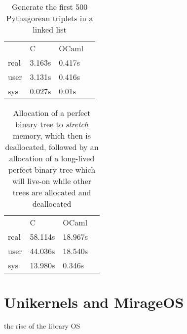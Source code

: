 \begin{table}
    \centering
    \caption{Generate the first 500 Pythagorean triplets in a linked list}
    \begin{tabular}{llll}\label{tab:pythagtab}
             & C      & OCaml  & \\
        real & 3.163s & 0.417s & \\
        user & 3.131s & 0.416s & \\
        sys  & 0.027s & 0.01s  &
    \end{tabular}
\end{table}


\begin{table}
    \centering
    \caption{Allocation of a perfect binary tree to \emph{stretch} memory, which then is deallocated, followed by an allocation of a long-lived perfect binary tree which will live-on while other trees are allocated and deallocated}
    \begin{tabular}{llll}\label{tab:bintreetab}
             & C       & OCaml   & \\
        real & 58.114s & 18.967s & \\
        user & 44.036s & 18.540s & \\
        sys  & 13.980s & 0.346s  &
    \end{tabular}
\end{table}



\section{Unikernels and MirageOS}\label{sec:mirage}
the rise of the library OS